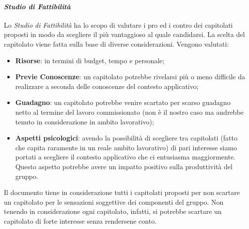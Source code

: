 \paragraph{\textit{Studio di Fattibilità}}
Lo \textit{Studio di Fattibilità} ha lo scopo di valutare i pro ed i contro dei capitolati proposti in modo da scegliere il più vantaggioso al quale candidarsi.
La scelta del capitolato viene fatta sulla base di diverse considerazioni.
Vengono valutati:
\begin{itemize}
    \item \textbf{Risorse}: in termini di budget, tempo e personale;
    \item \textbf{Previe Conoscenze}: un capitolato potrebbe rivelarsi più o meno difficile da realizzare a seconda delle conoscenze del contesto applicativo; 
    \item \textbf{Guadagno}: un capitolato potrebbe venire scartato per scarso guadagno netto al termine del lavoro commissionato (non è il nostro caso ma 
andrebbe tenuto in considerazione in ambito lavorativo);
    \item \textbf{Aspetti psicologici}: avendo la possibilità di scegliere tra capitolati (fatto che capita raramente in un reale ambito lavorativo) di pari interesse siamo portati a scegliere il contesto applicativo che ci entusiasma maggiormente.
    Questo aspetto potrebbe avere un impatto positivo sulla produttività del gruppo.
\end{itemize}

Il documento tiene in considerazione tutti i capitolati proposti per non scartare un capitolato per le sensazioni soggettive dei componenti del gruppo.
Non tenendo in considerazione ogni capitolato, infatti, si potrebbe scartare un capitolato di forte interesse senza rendersene conto.